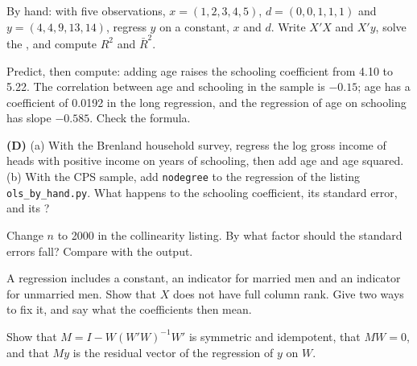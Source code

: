 \begin{exercise}[$\star\star$]\label{exo:b2:multiple-regression:5}
By hand: with five observations, $x = (1, 2, 3, 4, 5)$, $d = (0, 0, 1, 1, 1)$ and $y = (4, 4, 9, 13, 14)$, regress $y$ on
a constant, $x$ and $d$. Write $X'X$ and $X'y$, solve the , and compute $R^2$ and $\bar R^2$.
\end{exercise}

\begin{exercise}[$\star\star$]\label{exo:b2:multiple-regression:6}
Predict, then compute: adding age raises the schooling coefficient from 4.10 to 5.22. The correlation between age and
schooling in the sample is $-0.15$; age has a coefficient of 0.0192 in the long regression, and the regression of age on
schooling has slope $-0.585$. Check the  formula.
\end{exercise}

\begin{exercise}[$\star\star$]\label{exo:b2:multiple-regression:7}
\textbf{(D)} (a) With the Brenland household survey, regress the log gross income of heads with positive income on years
of schooling, then add age and age squared. (b) With the CPS sample, add \texttt{nodegree} to the regression of the
listing \texttt{ols\_by\_hand.py}. What happens to the schooling coefficient, its standard error, and its ?
\end{exercise}

\begin{exercise}[$\star\star$]\label{exo:b2:multiple-regression:8}
Change $n$ to 2000 in the collinearity listing. By what factor should the standard errors fall? Compare with the output.
\end{exercise}

\begin{exercise}[$\star\star$]\label{exo:b2:multiple-regression:9}
A regression includes a constant, an indicator for married men and an indicator for unmarried men. Show that $X$ does not
have full column rank. Give two ways to fix it, and say what the coefficients then mean.
\end{exercise}

\begin{exercise}[$\star\star\star$]\label{exo:b2:multiple-regression:10}
Show that $M = I - W(W'W)^{-1}W'$ is symmetric and idempotent, that $MW = 0$, and that $My$ is the residual vector of the
regression of $y$ on $W$.
\end{exercise}

